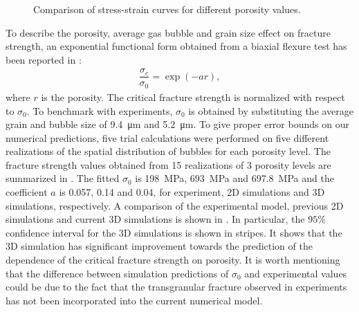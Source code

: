 \begin{figure}[!htbp]
  \centering
  \caption{Comparison of stress-strain curves for different porosity values.}
  \label{fig_porosity}
\end{figure}

To describe the porosity, average gas bubble and grain size effect on fracture strength, an exponential functional form obtained from a biaxial flexure test has been reported in \cite{oguma_1982}:
\begin{align}
  \dfrac{\sigma_c}{\sigma_0} = \exp(-a r),
\end{align}
where $r$ is the porosity. The critical fracture strength is normalized with respect to $\sigma_0$. To benchmark with experiments, $\sigma_0$ is obtained by substituting the average grain and bubble size of \SI{9.4}{\micro\meter} and \SI{5.2}{\micro\meter}. To give proper error bounds on our numerical predictions, five trial calculations were performed on five different realizations of the spatial distribution of bubbles for each porosity level. The fracture strength values obtained from 15 realizations of 3 porosity levels are summarized in . The fitted $\sigma_0$ is \SI{198}{\mega\pascal}, \SI{693}{\mega\pascal} and \SI{697.8}{\mega\pascal} and the coefficient $a$ is 0.057, 0.14 and 0.04, for experiment, 2D simulations and 3D simulations, respectively.
A comparison of the experimental model, previous 2D simulations \cite{pritam_2016} and current 3D simulations is shown in . In particular, the $95\%$ confidence interval for the 3D simulations is shown in stripes. It shows that the 3D simulation has significant improvement towards the prediction of the dependence of the critical fracture strength on porosity. It is worth mentioning that the difference between simulation predictions of $\sigma_0$ and experimental values could be due to the fact that the transgranular fracture observed in experiments \cite{evans_1969} has not been incorporated into the current numerical model.

